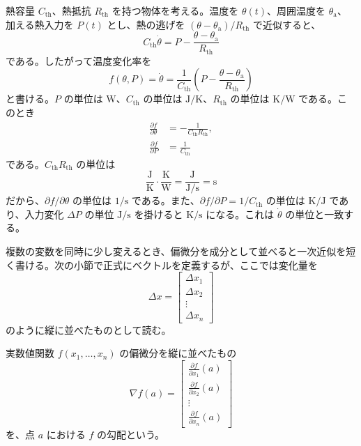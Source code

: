 \begin{example}[熱モデルの感度]
熱容量 $C_{\mathrm{th}}$、熱抵抗 $R_{\mathrm{th}}$ を持つ物体を考える。温度を $\theta(t)$、周囲温度を $\theta_{\mathrm{a}}$、加える熱入力を $P(t)$ とし、熱の逃げを $(\theta-\theta_{\mathrm{a}})/R_{\mathrm{th}}$ で近似すると、
\begin{equation}
  C_{\mathrm{th}}\dot{\theta}
  =
  P-\frac{\theta-\theta_{\mathrm{a}}}{R_{\mathrm{th}}}
\end{equation}
である。したがって温度変化率を
\begin{equation}
  f(\theta,P)
  =
  \dot{\theta}
  =
  \frac{1}{C_{\mathrm{th}}}
  \left(P-\frac{\theta-\theta_{\mathrm{a}}}{R_{\mathrm{th}}}\right)
\end{equation}
と書ける。$P$ の単位は W、$C_{\mathrm{th}}$ の単位は $\mathrm{J/K}$、$R_{\mathrm{th}}$ の単位は $\mathrm{K/W}$ である。このとき
\begin{align}
  \frac{\partial f}{\partial \theta}
  &=
  -\frac{1}{C_{\mathrm{th}}R_{\mathrm{th}}},\\
  \frac{\partial f}{\partial P}
  &=
  \frac{1}{C_{\mathrm{th}}}
\end{align}
である。$C_{\mathrm{th}}R_{\mathrm{th}}$ の単位は
\begin{equation}
  \frac{\mathrm{J}}{\mathrm{K}}\cdot
  \frac{\mathrm{K}}{\mathrm{W}}
  =
  \frac{\mathrm{J}}{\mathrm{J/s}}
  =
  \mathrm{s}
\end{equation}
だから、$\partial f/\partial\theta$ の単位は $1/\mathrm{s}$ である。また、$\partial f/\partial P=1/C_{\mathrm{th}}$ の単位は $\mathrm{K/J}$ であり、入力変化 $\Delta P$ の単位 $\mathrm{J/s}$ を掛けると $\mathrm{K/s}$ になる。これは $\dot{\theta}$ の単位と一致する。
\end{example}

複数の変数を同時に少し変えるとき、偏微分を成分として並べると一次近似を短く書ける。次の小節で正式にベクトルを定義するが、ここでは変化量を
\begin{equation}
  \Delta x=
  \begin{bmatrix}
    \Delta x_1\\
    \Delta x_2\\
    \vdots\\
    \Delta x_n
  \end{bmatrix}
\end{equation}
のように縦に並べたものとして読む。

\begin{definition}[勾配]
実数値関数 $f(x_1,\ldots,x_n)$ の偏微分を縦に並べたもの
\begin{equation}
  \nabla f(a)
  =
  \begin{bmatrix}
    \frac{\partial f}{\partial x_1}(a)\\
    \frac{\partial f}{\partial x_2}(a)\\
    \vdots\\
    \frac{\partial f}{\partial x_n}(a)
  \end{bmatrix}
\end{equation}
を、点 $a$ における $f$ の勾配という。
\end{definition}

